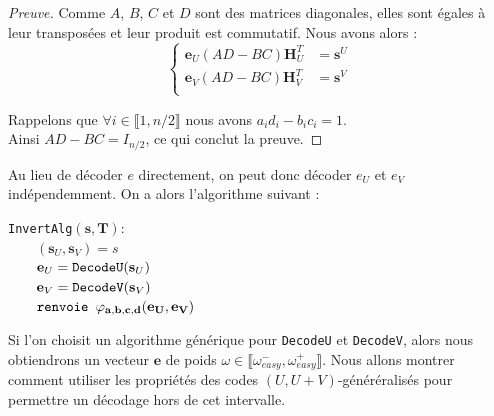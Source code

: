 \documentclass[12pt]{article}
\theoremstyle{plain}
\theoremstyle{definition}
\newcommand{\e}{\mathbf{e}}
\newcommand{\s}{\mathbf{s}}
\begin{document}
\begin{proof}[Preuve]
\noindent Comme $A$, $B$, $C$ et $D$ sont des matrices diagonales, elles sont égales à leur transposées et leur produit est commutatif. Nous avons alors :
\begin{equation*}
\left\{
\begin{split}
\e_U(AD - BC)\mathbf{H}_U^T &= \s^U\\
\e_V(AD - BC)\mathbf{H}_V^T &= \s^V\\
\end{split}
\right.
\end{equation*}

\noindent Rappelons que $\forall i \in \llbracket 1,n/2\rrbracket$ nous avons $a_id_i - b_ic_i = 1$. \\
Ainsi $AD-BC = I_{n/2}$, ce qui conclut la preuve.

\end{proof}

\noindent Au lieu de décoder $e$ directement, on peut donc décoder $e_U$ et $e_V$ indépendemment. On a alors l'algorithme suivant : \\
\begin{flushleft}
\leftskip=2cm
\verb|InvertAlg|$(\mathbf{s},\mathbf{T}) : $\\
$\qquad (\mathbf{s}_U, \mathbf{s}_V) = s $\\
$\qquad \mathbf{e}_U = \verb|DecodeU|(\mathbf{s}_U) $\\
$\qquad \mathbf{e}_V = \verb|DecodeV|(\mathbf{s}_V)$ \\
$\qquad \verb|renvoie | \varphi_{\mathbf{a},\mathbf{b},\mathbf{c},\mathbf{d}}(\mathbf{e_U},\mathbf{e_V})$ \\
\leftskip=0cm
\vspace{0.1in}

\end{flushleft}
Si l'on choisit un algorithme générique pour \verb|DecodeU| et \verb|DecodeV|, alors nous obtiendrons un vecteur $\mathbf{e}$ de poids $\omega \in \llbracket\omega_{easy}^-,\omega_{easy}^+\rrbracket$. Nous allons montrer comment utiliser les propriétés des codes $(U,U+V)$-généréralisés pour permettre un décodage hors de cet intervalle. 
\end{document}
